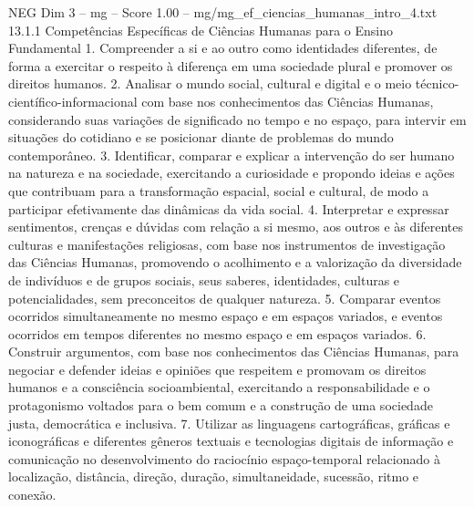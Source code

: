 \begin{textsample}{NEG Dim 3 – mg – Score 1.00 – mg/mg\_ef\_ciencias\_humanas\_intro\_4.txt}  \label{ex:f3_neg_025}
13.1.1 Competências Específicas de Ciências Humanas para o Ensino Fundamental 1.
Compreender a si e ao outro como identidades diferentes, de forma a exercitar o respeito à diferença em uma sociedade plural e promover os direitos humanos. 2.
Analisar o mundo social, cultural e digital e o meio técnico-científico-informacional com base nos conhecimentos das Ciências Humanas, considerando suas variações de significado no tempo e no espaço, para intervir em situações do cotidiano e se posicionar diante de problemas do mundo contemporâneo. 3.
Identificar, comparar e explicar a intervenção do ser humano na natureza e na sociedade, exercitando a curiosidade e propondo ideias e ações que contribuam para a transformação espacial, social e cultural, de modo a participar efetivamente das dinâmicas da vida social. 4.
Interpretar e expressar sentimentos, crenças e dúvidas com relação a si mesmo, aos outros e às diferentes culturas e manifestações religiosas, com base nos instrumentos de investigação das Ciências Humanas, promovendo o acolhimento e a valorização da diversidade de indivíduos e de grupos sociais, seus saberes, identidades, culturas e potencialidades, sem preconceitos de qualquer natureza. 5.
Comparar eventos ocorridos simultaneamente no mesmo espaço e em espaços variados, e eventos ocorridos em tempos diferentes no mesmo espaço e em espaços variados. 6.
Construir argumentos, com base nos conhecimentos das Ciências Humanas, para negociar e defender ideias e opiniões que respeitem e promovam os direitos humanos e a consciência socioambiental, exercitando a responsabilidade e o protagonismo voltados para o bem comum e a construção de uma sociedade justa, democrática e inclusiva. 7.
Utilizar as linguagens cartográficas, gráficas e iconográficas e diferentes gêneros textuais e tecnologias digitais de informação e comunicação no desenvolvimento do raciocínio espaço-temporal relacionado à localização, distância, direção, duração, simultaneidade, sucessão, ritmo e conexão.

\end{textsample}
